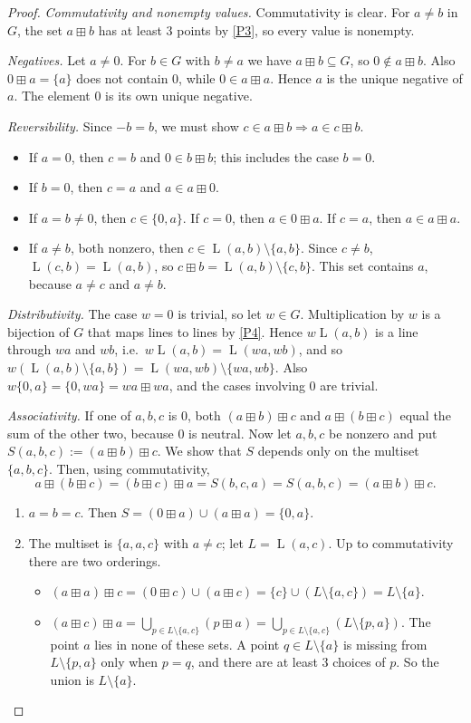 \documentclass[11pt]{article}
\theoremstyle{definition}
\theoremstyle{remark}
\newcommand{\bp}{\boxplus}
\DeclareMathOperator{\Ln}{L}
\begin{document}
\begin{proof}
\emph{Commutativity and nonempty values.} Commutativity is clear. For $a\neq b$ in $G$, the set $a\bp b$ has at least $3$ points by \ref{P3}, so every value is nonempty.

\emph{Negatives.} Let $a\neq0$. For $b\in G$ with $b\neq a$ we have $a\bp b\subseteq G$, so $0\notin a\bp b$. Also $0\bp a=\{a\}$ does not contain $0$, while $0\in a\bp a$. Hence $a$ is the unique negative of $a$. The element $0$ is its own unique negative.

\emph{Reversibility.} Since $-b=b$, we must show $c\in a\bp b\Rightarrow a\in c\bp b$.
\begin{itemize}[nosep]
\item If $a=0$, then $c=b$ and $0\in b\bp b$; this includes the case $b=0$.
\item If $b=0$, then $c=a$ and $a\in a\bp 0$.
\item If $a=b\neq0$, then $c\in\{0,a\}$. If $c=0$, then $a\in 0\bp a$. If $c=a$, then $a\in a\bp a$.
\item If $a\neq b$, both nonzero, then $c\in\Ln(a,b)\setminus\{a,b\}$. Since $c\neq b$, $\Ln(c,b)=\Ln(a,b)$, so $c\bp b=\Ln(a,b)\setminus\{c,b\}$. This set contains $a$, because $a\neq c$ and $a\neq b$.
\end{itemize}

\emph{Distributivity.} The case $w=0$ is trivial, so let $w\in G$. Multiplication by $w$ is a bijection of $G$ that maps lines to lines by \ref{P4}. Hence $w\Ln(a,b)$ is a line through $wa$ and $wb$, i.e.\ $w\Ln(a,b)=\Ln(wa,wb)$, and so $w(\Ln(a,b)\setminus\{a,b\})=\Ln(wa,wb)\setminus\{wa,wb\}$. Also $w\{0,a\}=\{0,wa\}=wa\bp wa$, and the cases involving $0$ are trivial.

\emph{Associativity.} If one of $a,b,c$ is $0$, both $(a\bp b)\bp c$ and $a\bp(b\bp c)$ equal the sum of the other two, because $0$ is neutral.
Now let $a,b,c$ be nonzero and put $S(a,b,c):=(a\bp b)\bp c$. We show that $S$ depends only on the multiset $\{a,b,c\}$. Then, using commutativity,
\[
a\bp(b\bp c)=(b\bp c)\bp a=S(b,c,a)=S(a,b,c)=(a\bp b)\bp c.
\]
\begin{enumerate}[label=\textup{Case \arabic*.},ref=\arabic*,leftmargin=*]
\item\label{case1} $a=b=c$. Then $S=(0\bp a)\cup(a\bp a)=\{0,a\}$.

\item\label{case2} The multiset is $\{a,a,c\}$ with $a\neq c$; let $L=\Ln(a,c)$. Up to commutativity there are two orderings.
\begin{itemize}[nosep]
\item $(a\bp a)\bp c=(0\bp c)\cup(a\bp c)=\{c\}\cup(L\setminus\{a,c\})=L\setminus\{a\}$.
\item $(a\bp c)\bp a=\bigcup_{p\in L\setminus\{a,c\}}(p\bp a)=\bigcup_{p\in L\setminus\{a,c\}}(L\setminus\{p,a\})$. The point $a$ lies in none of these sets. A point $q\in L\setminus\{a\}$ is missing from $L\setminus\{p,a\}$ only when $p=q$, and there are at least $3$ choices of $p$. So the union is $L\setminus\{a\}$.
\end{itemize}


\end{enumerate}
\end{proof}
\end{document}
